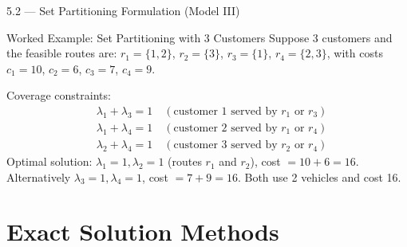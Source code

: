 \documentclass[aspectratio=169,10pt]{beamer}
\begin{document}
\begin{frame}[allowframebreaks]{5.2 --- Set Partitioning Formulation (Model III)}
\begin{exampleblock}{Worked Example: Set Partitioning with 3 Customers}
Suppose 3 customers and the feasible routes are:
$r_1 = \{1,2\}$, $r_2 = \{3\}$, $r_3 = \{1\}$, $r_4 = \{2,3\}$, with costs
$c_1=10$, $c_2=6$, $c_3=7$, $c_4=9$.

\medskip
Coverage constraints:
\begin{align*}
  &\lambda_1 + \lambda_3 = 1 \quad (\text{customer 1 served by } r_1 \text{ or } r_3)\\
  &\lambda_1 + \lambda_4 = 1 \quad (\text{customer 2 served by } r_1 \text{ or } r_4)\\
  &\lambda_2 + \lambda_4 = 1 \quad (\text{customer 3 served by } r_2 \text{ or } r_4)
\end{align*}
Optimal solution: $\lambda_1 = 1, \lambda_2 = 1$ (routes $r_1$ and $r_2$),
cost $= 10 + 6 = 16$.  Alternatively $\lambda_3=1, \lambda_4=1$, cost $= 7+9=16$.
Both use 2 vehicles and cost 16.
\end{exampleblock}

\end{frame}

\section{Exact Solution Methods}
\end{document}
